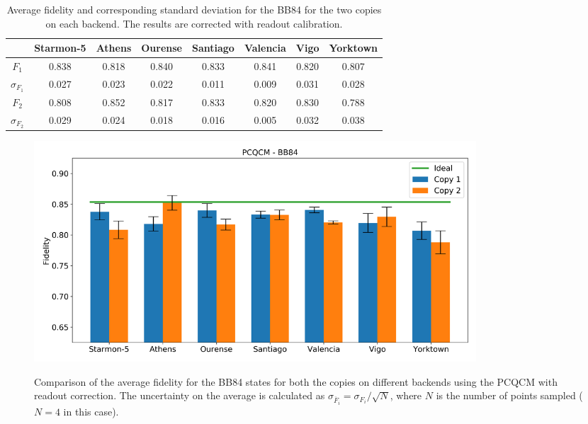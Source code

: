 \begin{table}[H]
  \centering
  \begin{tabular}{|c|c|c|c|c|c|c|c|}
  \hline
  \textbf{} & \textbf{Starmon-5} & \textbf{Athens} & \textbf{Ourense} & \textbf{Santiago} & \textbf{Valencia} & \textbf{Vigo} & \textbf{Yorktown} \\ \hline
  $F_1$              & 0.838 & 0.818 & 0.840 & 0.833 & 0.841 & 0.820 & 0.807 \\ \hline
  $\sigma_{F_1}$     & 0.027 & 0.023 & 0.022 & 0.011 & 0.009 & 0.031 & 0.028 \\ \hline
  $F_2$              & 0.808 & 0.852 & 0.817 & 0.833 & 0.820 & 0.830 & 0.788 \\ \hline
  $\sigma_{F_2}$     & 0.029 & 0.024 & 0.018 & 0.016 & 0.005 & 0.032 & 0.038 \\ \hline
  \end{tabular}
  \caption{Average fidelity and corresponding standard deviation for the BB84 for the two copies on each backend. The results are corrected with readout calibration.}
  \label{tab:results_pcqcm_bb84_corrected}
\end{table}
\begin{figure}[H]
  \centering
          \includegraphics[width=0.8\textwidth]{Figures/PhaseCovariant/Histograms/histo_bb84_corrected.png}
      \label{fig:pc_histo_bb84_corrected}
      \caption{Comparison of the average fidelity for the BB84 states for both the copies on different backends using the PCQCM with readout correction. The uncertainty on the average is calculated as $\sigma_{\overline{F}_i}=\sigma_{F_i}/\sqrt{N}$, where $N$ is the number of points sampled ($N=4$ in this case).}
\end{figure}

